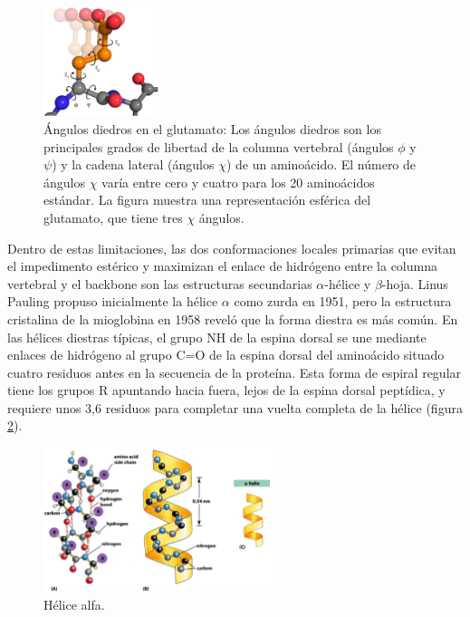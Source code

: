 \begin{figure}[h]
\centering
\includegraphics[width = 0.3\textwidth]{figs/paste-6EE800AE.png}
\caption{Ángulos diedros en el glutamato: Los ángulos diedros son los principales grados de libertad de la columna vertebral (ángulos $\phi$ y $\psi$) y la cadena lateral (ángulos $\chi$) de un aminoácido. El número de ángulos $\chi$ varía entre cero y cuatro para los 20 aminoácidos estándar. La figura muestra una representación esférica del glutamato, que tiene tres $\chi$ ángulos.}
\label{fig:chi}
\end{figure}

Dentro de estas limitaciones, las dos conformaciones locales primarias que evitan el impedimento estérico y maximizan el enlace de hidrógeno entre la columna vertebral y el backbone son las estructuras secundarias $\alpha$-hélice y $\beta$-hoja. Linus Pauling propuso inicialmente la hélice $\alpha$ como zurda en 1951, pero la estructura cristalina de la mioglobina en 1958 reveló que la forma diestra es más común. En las hélices diestras típicas, el grupo NH de la espina dorsal se une mediante enlaces de hidrógeno al grupo C=O de la espina dorsal del aminoácido situado cuatro residuos antes en la secuencia de la proteína. Esta forma de espiral regular tiene los grupos R apuntando hacia fuera, lejos de la espina dorsal peptídica, y requiere unos 3,6 residuos para completar una vuelta completa de la hélice (figura \ref{fig:alfa}).

\begin{figure}[h]
\centering
\includegraphics[width = 0.6\textwidth]{figs/alpha.png}
\caption{Hélice alfa.}
\label{fig:alfa}
\end{figure}

